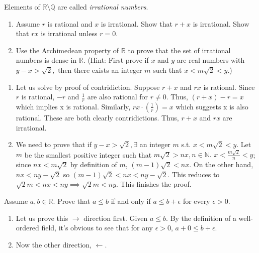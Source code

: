 \documentclass[12pt,letterpaper,boxed]{hmcpset}
\begin{document}
\begin{problem}[Exercise 4.6.]
Elements of $\mathbb{R}\setminus\mathbb{Q}$ are called \textit{irrational numbers}.
\begin{enumerate}
	\itemsep0em
	\item Assume $r$ is rational and $x$ is irrational. Show that $r + x$ is irrational. Show that $rx$ is irrational unless $r=0$.
	\item Use the Archimedean property of $\mathbb{R}$ to prove that the set of irrational numbers is dense in $\mathbb{R}.$ (Hint: First prove if $x$ and $y$ are real numbers with $y - x > \sqrt{2},$ then there exists an integer $m$ such that $x < m\sqrt{2} < y$.)
\end{enumerate}
\end{problem}

\begin{solution}
\begin{enumerate}
	\itemsep0em
	\item Let us solve by proof of contridiction. Suppose $r + x$ and $rx$ is rational. Since $r$ is rational, $-r$ and \(\frac{1}{r}\) are also rational for $r \neq 0$. Thus, $(r + x) - r = x$ which implies x is rational. 
	Similarly, $rx \cdot (\frac{1}{r}) = x$ which suggests x is also rational. These are both clearly contridictions. Thus, $r + x$ and $rx$ are irrational.
	\item We need to prove that if $y - x > \sqrt{2}, \exists$ an integer $m$ s.t. $x < m\sqrt{2} < y.$ Let $m$ be the smallest positive integer such that $m\sqrt{2} > nx, n\in\mathbb{N}.$ $x < \frac{m\sqrt{2}}{n} < y$; since $nx<m\sqrt{2}$ by definition of $m$, $(m - 1)\sqrt{2} < nx.$ On the other hand, $nx < ny - \sqrt{2}$ so $(m-1)\sqrt{2} < nx < ny - \sqrt{2}.$ This reduces to $\sqrt{2}m < nx < ny \implies \sqrt{2}m < ny.$ This finishes the proof. 
\end{enumerate}
\end{solution}

\begin{problem}[Exercise 4.8.]
Assume $a, b \in \mathbb{R}.$ Prove that $a \leq b$ if and only if $a \leq b + \epsilon$ for every $\epsilon > 0.$
\end{problem}

\begin{solution}
\begin{enumerate}
		\itemsep0em
		\item Let us prove this $\rightarrow$ direction first. Given $a \leq b.$ By the definition of a well-ordered field, it's obvious to see that for any $\epsilon > 0$, $a + 0 \leq b + \epsilon$.
		\item Now the other direction, $\leftarrow$. 
\end{enumerate}	
\end{solution}
\end{document}
